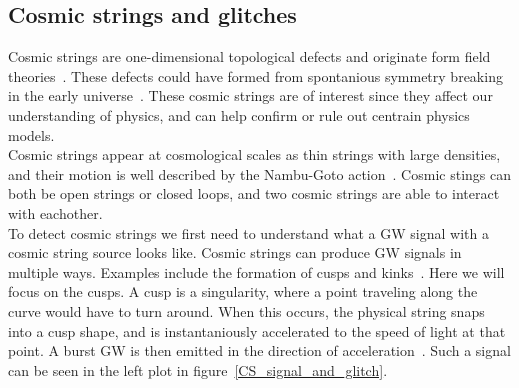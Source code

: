 \documentclass{article}
\newcommand\C[1]\null
\begin{document}
\begin{multicols}{2}
\subsection{Cosmic strings and glitches}
Cosmic strings are one-dimensional topological defects and originate form field theories~\cite{Meijer_2024}.
These defects could have formed from spontanious symmetry breaking in the early universe~\cite{schmitz2024gravitationalwavescosmicstrings}.
These cosmic strings are of interest since they affect our understanding of physics, and can help confirm or rule out centrain physics models. \\
\indent
Cosmic strings appear at cosmological scales as thin strings with large densities, and their motion is well described by the Nambu-Goto action~\cite{MairiSakellariadou}.
Cosmic stings can both be open strings or closed loops, and two cosmic strings are able to interact with eachother. \C{Needs citation}\\
\indent
To detect cosmic strings we first need to understand what a GW signal with a cosmic string source looks like.
Cosmic strings can produce GW signals in multiple ways. Examples include the formation of cusps and kinks~\cite{PhysRevLett126241102}. 
Here we will focus on the cusps. A cusp is a singularity, where a point traveling along the curve would have to turn around.
When this occurs, the physical string snaps into a cusp shape, and is instantaniously accelerated to the speed of light at that point.
A burst GW is then emitted in the direction of acceleration~\cite{Meijer_2024}.
Such a signal can be seen in the left plot in figure~\ref{CS_signal_and_glitch}.\\
\begin{figure}[h!]
    \centering

\end{figure}
\end{multicols}
\end{document}
